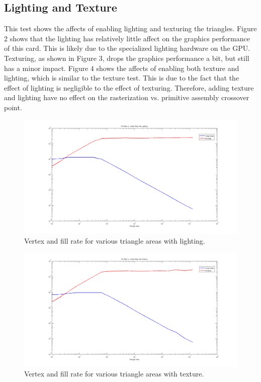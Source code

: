 \documentclass[12pt] {article}
\begin{document}
\newpage
\subsection{Lighting and Texture}
This test shows the affects of enabling lighting and texturing the triangles. Figure 2 shows that the lighting has relatively little affect on the graphics performance of this card. This is likely due to the specialized lighting hardware on the GPU. Texturing, as shown in Figure 3, drops the graphics performance a bit, but still has a minor impact. Figure 4 shows the affects of enabling both texture and lighting, which is similar to the texture test. This is due to the fact that the effect of lighting is negligible to the effect of texturing. Therefore, adding texture and lighting have no effect on the rasterization vs. primitive assembly crossover point.
\begin{figure}[ht!]
	\centering
	\includegraphics[width=5in]{figures/results2-lighting.png}
	\caption{Vertex and fill rate for various triangle areas with lighting.}
\end{figure}
\FloatBarrier

\begin{figure}[ht!]
	\centering
	\includegraphics[width=5in]{figures/results2-texture.png}
	\caption{Vertex and fill rate for various triangle areas with texture.}
\end{figure}
\FloatBarrier
\end{document}
